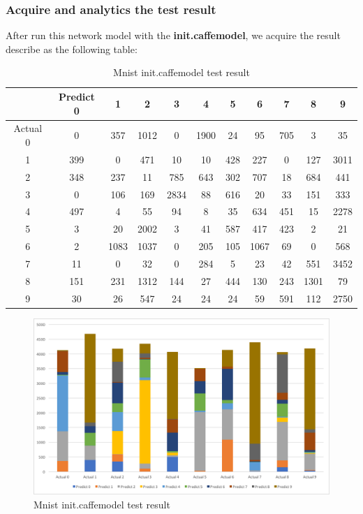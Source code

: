 \documentclass[11pt]{article}
\begin{document}
\subsubsection{Acquire and analytics the test result}

After run this network model with the \textbf{init.caffemodel}, we acquire the result describe as the following table:
\begin{table}[H]
\begin{center}
\begin{tabular}{| c | c | c | c | c | c | c | c | c | c | c |}
\hline
  &Predict 0 & 1 & 2 & 3 & 4 & 5 & 6 & 7 & 8 & 9 \\ 
\hline
Actual 0 & 0 & 357 & 1012 & 0 & 1900 & 24 & 95 & 705 & 3 & 35 \\
\hline
1 & 399 & 0 & 471 & 10 & 10 & 428 & 227 & 0 & 127 & 3011\\
\hline
2 & 348 & 237 & 11 & 785 & 643 & 302 & 707 & 18 & 684 & 441\\
\hline
3 & 0 & 106 & 169 & 2834 & 88 & 616 & 20 & 33 & 151 & 333\\
\hline
4 & 497 & 4 & 55 & 94 & 8 & 35 & 634 & 451 & 15 & 2278\\
\hline
5 & 3 & 20 & 2002 & 3 & 41 & 587 & 417 & 423 & 2 & 21\\
\hline
6 & 2 & 1083 & 1037 & 0 & 205 & 105 & 1067 & 69 & 0 & 568\\
\hline
7 & 11 & 0 & 32 & 0 & 284 & 5 & 23 & 42 & 551 & 3452\\
\hline
8 & 151 & 231 & 1312 & 144 & 27 & 444 & 130 & 243 & 1301 & 79\\
\hline
9 & 30 & 26 & 547 & 24 & 24 & 24 & 59 & 591 & 112 & 2750\\
\hline
\end{tabular}
\caption {Mnist init.caffemodel test result}
\end{center}
\end{table}

\begin{figure}[H]
\centering
\includegraphics[width=1\textwidth]{images/mnist_test_result}
\caption{Mnist init.caffemodel test result}
\label{fig:samplepagoda}
\end{figure}
\end{document}
